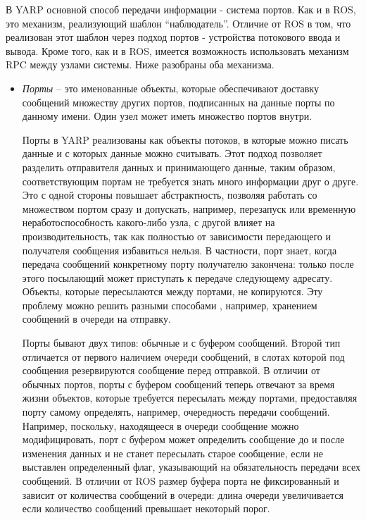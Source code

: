 В YARP основной способ передачи информации - система портов. Как и в ROS, это механизм, реализующий шаблон \enquote{наблюдатель}. Отличие от ROS в том, что реализован этот шаблон через подход портов - устройства потокового ввода и вывода. Кроме того, как и в ROS, имеется возможность использовать механизм RPC между узлами системы. Ниже разобраны оба механизма.

\begin{itemize}
	\item \textit{Порты} -- это именованные объекты, которые обеспечивают доставку сообщений множеству других портов, подписанных на данные порты по данному имени. Один узел может иметь множество портов внутри. 
	
	Порты в YARP реализованы как объекты потоков, в которые можно писать данные и с которых данные можно считывать. Этот подход позволяет разделить отправителя данных и принимающего данные, таким образом, соответствующим портам не требуется знать много информации друг о друге. Это с одной стороны повышает абстрактность, позволяя работать со множеством портом сразу и допускать, например, перезапуск или временную неработоспособность какого-либо узла, с другой влияет на производительность, так как полностью от зависимости передающего и получателя сообщения избавиться нельзя. В частности, порт знает, когда передача сообщений конкретному порту получателю закончена: только после этого посылающий может приступать к передаче следующему адресату. Объекты, которые пересылаются между портами, не копируются. Эту проблему можно решить разными способами \cite{yarp-ports}, например, хранением сообщений в очереди на отправку.
	
	Порты бывают двух типов: обычные и с буфером сообщений. Второй тип отличается от первого наличием очереди сообщений, в слотах которой под сообщения резервируются сообщение перед отправкой. В отличии от обычных портов, порты с буфером сообщений теперь отвечают за время жизни объектов, которые требуется пересылать между портами, предоставляя порту самому определять, например, очередность передачи сообщений. Например, поскольку, находящееся в очереди сообщение можно модифицировать, порт с буфером может определить сообщение до и после изменения данных и не станет пересылать старое сообщение, если не выставлен определенный флаг, указывающий на обязательность передачи всех сообщений. В отличии от ROS размер буфера порта не фиксированный и зависит от количества сообщений в очереди: длина очереди увеличивается если количество сообщений превышает некоторый порог.
	

\end{itemize}

